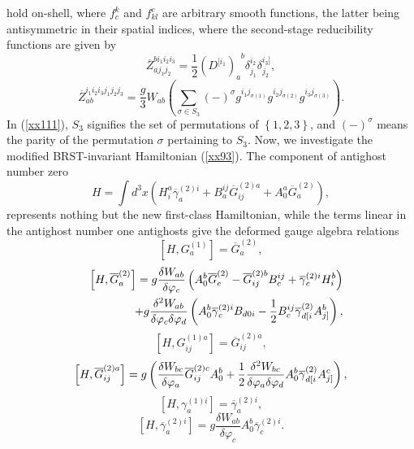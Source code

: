 \documentclass[a4paper,12pt]{article}
\begin{document}
hold on-shell, where $f_{c}^{k}$ and $f_{kl}^{c}$ are arbitrary smooth
functions, the latter being antisymmetric in their spatial indices, where
the second-stage reducibility functions are given by 
\begin{equation}
\overline{Z}_{aj_{1}j_{2}}^{bi_{1}i_{2}i_{3}}=\frac{1}{2}\left(
D^{[i_{1}}\right) _{a}^{\;\;b}\delta _{j_{1}}^{i_{2}}\delta
_{j_{2}}^{i_{3}]},  \label{xx110}
\end{equation}
\begin{equation}
\overline{Z}_{ab}^{i_{1}i_{2}i_{3}j_{1}j_{2}j_{3}}=\frac{g}{3}W_{ab}\left(
\sum\limits_{\sigma \in S_{3}}(-)^{\sigma }g^{i_{1}j_{\sigma
(1)}}g^{i_{2}j_{\sigma (2)}}g^{i_{3}j_{\sigma (3)}}\right) .  \label{xx111}
\end{equation}
In (\ref{xx111}), $S_{3}$ signifies the set of permutations of $\left\{
1,2,3\right\} $, and $(-)^{\sigma }$ means the parity of the permutation $%
\sigma $ pertaining to $S_{3}$. Now, we investigate the modified
BRST-invariant Hamiltonian (\ref{xx93}). The component of antighost number
zero 
\begin{equation}
H=\int d^{3}x\left( H_{i}^{a}\overline{\gamma }_{a}^{(2)i}+B_{a}^{ij}%
\overline{G}_{ij}^{(2)a}+A_{0}^{a}\overline{G}_{a}^{(2)}\right) ,
\label{xx112}
\end{equation}
represents nothing but the new first-class Hamiltonian, while the terms
linear in the antighost number one antighosts give the deformed gauge
algebra relations 
\begin{equation}
\left[ H,G_{a}^{(1)}\right] =\overline{G}_{a}^{(2)},  \label{xx113}
\end{equation}
\begin{eqnarray}
&&\left[ H,\overline{G}_{a}^{(2)}\right] =g\frac{\delta W_{ab}}{\delta
\varphi _{c}}\left( A_{0}^{b}\overline{G}_{c}^{(2)}-\overline{G}%
_{ij}^{(2)b}B_{c}^{ij}+\overline{\gamma }_{c}^{(2)i}H_{i}^{b}\right)  
\nonumber \\
&&+g\frac{\delta ^{2}W_{ab}}{\delta \varphi _{c}\delta \varphi _{d}}\left(
A_{0}^{b}\overline{\gamma }_{c}^{(2)i}B_{d0i}-\frac{1}{2}B_{c}^{ij}\overline{%
\gamma }_{d[i}^{(2)}A_{j]}^{b}\right) ,  \label{xx114}
\end{eqnarray}
\begin{equation}
\left[ H,G_{ij}^{(1)a}\right] =\overline{G}_{ij}^{(2)a},  \label{xx115}
\end{equation}
\begin{equation}
\left[ H,\overline{G}_{ij}^{(2)a}\right] =g\left( \frac{\delta W_{bc}}{%
\delta \varphi _{a}}\overline{G}_{ij}^{(2)c}A_{0}^{b}+\frac{1}{2}\frac{%
\delta ^{2}W_{bc}}{\delta \varphi _{a}\delta \varphi _{d}}A_{0}^{b}\overline{%
\gamma }_{d[i}^{(2)}A_{j]}^{c}\right) ,  \label{xx116}
\end{equation}
\begin{equation}
\left[ H,\gamma _{a}^{(1)i}\right] =\overline{\gamma }_{a}^{(2)i},
\label{xx117}
\end{equation}
\begin{equation}
\left[ H,\overline{\gamma }_{a}^{(2)i}\right] =g\frac{\delta W_{ab}}{\delta
\varphi _{c}}A_{0}^{b}\overline{\gamma }_{c}^{(2)i}.  \label{xx118}
\end{equation}
\end{document}
